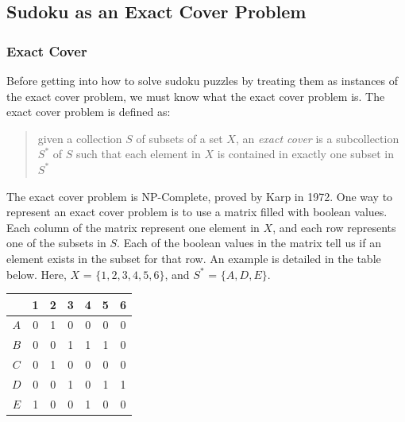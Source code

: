 \subsection{Sudoku as an Exact Cover Problem}
    \subsubsection{Exact Cover}
    Before getting into how to solve sudoku puzzles by treating them as instances of the exact cover problem, we must know
    what the exact cover problem is. The exact cover problem is defined as:
    \begin{verse}
        given a collection $S$ of subsets of a set $X$, an \textit{exact cover} is a subcollection $S^*$ of $S$ such that each element
        in $X$ is contained in exactly one subset in $S^*$
    \end{verse}
    The exact cover problem is NP-Complete, proved by Karp in 1972\cite{npc}. One way to represent an exact cover problem is to use
    a matrix filled with boolean values. Each column of the matrix represent one element in $X$, and each row represents one of the
    subsets in $S$. Each of the boolean values in the matrix tell us if an element exists in the subset for that row. An example is
    detailed in the table below. Here, $X$ = $\{1,2,3,4,5,6\}$, and $S^*$ = $\{A,D,E\}$.
    \begin{center}\begin{tabular}{|c|c|c|c|c|c|c|}
        \hline
            &   1   &   2   &   3   &   4   &   5   &   6   \\  \hline
        $A$ &   0   &   1   &   0   &   0   &   0   &   0   \\  \hline
        $B$ &   0   &   0   &   1   &   1   &   1   &   0   \\  \hline
        $C$ &   0   &   1   &   0   &   0   &   0   &   0   \\  \hline
        $D$ &   0   &   0   &   1   &   0   &   1   &   1   \\  \hline
        $E$ &   1   &   0   &   0   &   1   &   0   &   0   \\
        \hline
    \end{tabular}\end{center}
    
